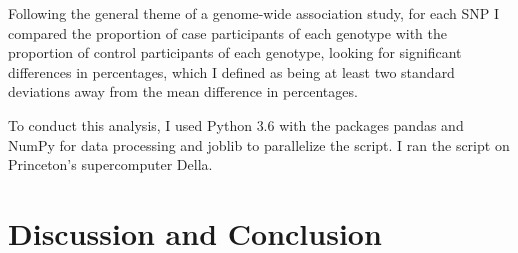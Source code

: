 \documentclass[12pt]{report}
\begin{document}
Following the general theme of a genome-wide association study, for each SNP I 
compared the proportion of case participants of each genotype with the proportion
of control participants of each genotype, looking for significant differences in 
percentages, which I defined as being at least two standard deviations away from
the mean difference in percentages.

To conduct this analysis, I used Python 3.6 with the packages pandas\cite{pandas}
and NumPy\cite{numpy} for data processing and joblib to parallelize the script. I ran
the script on Princeton's supercomputer Della.


\chapter{Discussion and Conclusion}





\end{document}
